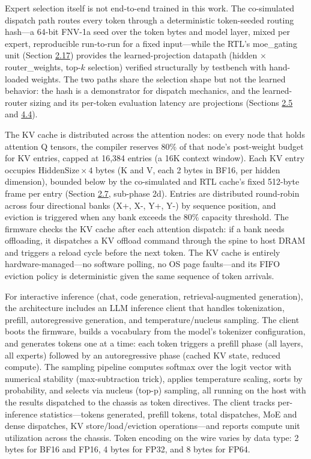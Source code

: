 \documentclass[12pt,onecolumn]{article}
\begin{document}
Expert selection itself is not end-to-end trained in this work. The co-simulated dispatch path routes every token through a deterministic token-seeded routing hash---a 64-bit FNV-1a seed over the token bytes and model layer, mixed per expert, reproducible run-to-run for a fixed input---while the RTL's moe\_gating unit (Section \hyperref[sec:2.17]{2.17}) provides the learned-projection datapath (hidden $\times$ router\_weights, top-$k$ selection) verified structurally by testbench with hand-loaded weights. The two paths share the selection shape but not the learned behavior: the hash is a demonstrator for dispatch mechanics, and the learned-router sizing and its per-token evaluation latency are projections (Sections \hyperref[sec:2.5]{2.5} and \hyperref[sec:4.4]{4.4}).

The KV cache is distributed across the attention nodes: on every node that holds attention Q tensors, the compiler reserves 80\% of that node's post-weight budget for KV entries, capped at 16,384 entries (a 16K context window). Each KV entry occupies $\mathrm{HiddenSize} \times 4$ bytes (K and V, each 2 bytes in BF16, per hidden dimension), bounded below by the co-simulated and RTL cache's fixed 512-byte frame per entry (Section \hyperref[sec:2.7]{2.7}, sub-phase 2d). Entries are distributed round-robin across four directional banks (X+, X-, Y+, Y-) by sequence position, and eviction is triggered when any bank exceeds the 80\% capacity threshold. The firmware checks the KV cache after each attention dispatch: if a bank needs offloading, it dispatches a KV offload command through the spine to host DRAM and triggers a reload cycle before the next token. The KV cache is entirely hardware-managed---no software polling, no OS page faults---and its FIFO eviction policy is deterministic given the same sequence of token arrivals.

For interactive inference (chat, code generation, retrieval-augmented generation), the architecture includes an LLM inference client that handles tokenization, prefill, autoregressive generation, and temperature/nucleus sampling. The client boots the firmware, builds a vocabulary from the model's tokenizer configuration, and generates tokens one at a time: each token triggers a prefill phase (all layers, all experts) followed by an autoregressive phase (cached KV state, reduced compute). The sampling pipeline computes softmax over the logit vector with numerical stability (max-subtraction trick), applies temperature scaling, sorts by probability, and selects via nucleus (top-p) sampling, all running on the host with the results dispatched to the chassis as token directives. The client tracks per-inference statistics---tokens generated, prefill tokens, total dispatches, MoE and dense dispatches, KV store/load/eviction operations---and reports compute unit utilization across the chassis. Token encoding on the wire varies by data type: 2 bytes for BF16 and FP16, 4 bytes for FP32, and 8 bytes for FP64.
\end{document}
